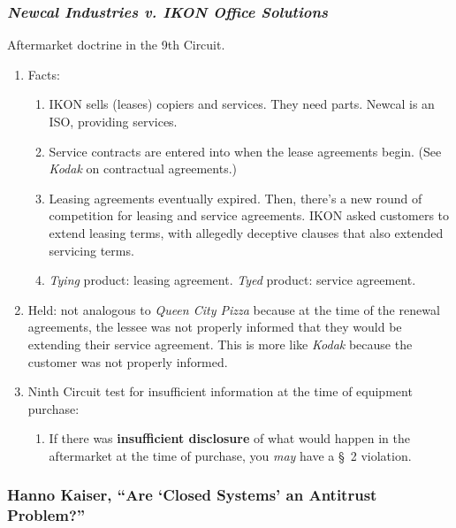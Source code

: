 \subsubsection{\emph{Newcal Industries v. IKON Office Solutions}}

Aftermarket doctrine in the 9th Circuit.

\begin{enumerate}
    \item Facts:
    \begin{enumerate}
        \item IKON sells (leases) copiers and services. They need parts. Newcal is an 
        ISO, providing services.
        \item Service contracts are entered into when the lease agreements 
        begin. (See \emph{Kodak} on contractual agreements.)
        \item Leasing agreements eventually expired. Then, there's a new round 
        of competition for leasing and service agreements. IKON asked 
        customers to extend leasing terms, with allegedly deceptive clauses 
        that also extended servicing terms.
        \item \emph{Tying} product: leasing agreement. \emph{Tyed} product: 
        service agreement.
    \end{enumerate}
    \item Held: not analogous to \emph{Queen City Pizza} because at the time 
    of the renewal agreements, the lessee was not properly informed that they 
    would be extending their service agreement. This is more like \emph{Kodak} 
    because the customer was not properly informed.
    \item Ninth Circuit test for insufficient information at the time of 
    equipment purchase:
    \begin{enumerate}
        \item If there was \textbf{insufficient disclosure} of what would 
        happen in the aftermarket at the time of purchase, you \emph{may} have 
        a \S\ 2 violation.
    \end{enumerate}
\end{enumerate}

\subsubsection{Hanno Kaiser, ``Are `Closed Systems' an Antitrust Problem?''}

